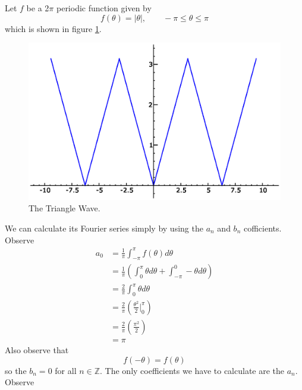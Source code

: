 \begin{ex}
Let $f$ be a 2$\pi$ periodic function given by
\begin{equation}
f(\theta)=|\theta|,\qquad -\pi\leq\theta\leq\pi
\end{equation}
which is shown in figure \ref{fig:2April2008:triangleWave}.
\begin{figure}
\begin{center}
\includegraphics[width=\textwidth]{img/2April2008triangleWave.eps}
\end{center}
\caption{The Triangle Wave.}
\label{fig:2April2008:triangleWave}
\end{figure}
We can calculate its Fourier series simply by using the
$a_n$ and $b_n$ cofficients. Observe
\begin{subequations}
\begin{align}
a_{0} &= \frac{1}{\pi}\int^{\pi}_{-\pi}f(\theta)d\theta \\
&= \frac{1}{\pi}\left(\int^{\pi}_{0}\theta d\theta +
\int^{0}_{-\pi}-\theta d\theta\right) \\
&= \frac{2}{\pi}\int^{\pi}_{0}\theta d\theta \\
&= \frac{2}{\pi}\left(\frac{\theta^2}{2}\Big|^{\pi}_{0}\right)\\
&= \frac{2}{\pi}\left(\frac{\pi^2}{2}\right) \\
&= \pi
\end{align}
\end{subequations}
Also observe that
\begin{equation}
f(-\theta)=f(\theta)
\end{equation}
so the $b_{n}=0$ for all $n\in\mathbb{Z}$. The only
coefficients we have to calculate are the $a_{n}$. Observe

\end{ex}
